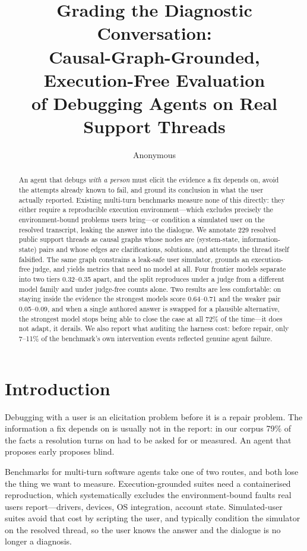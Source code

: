 \documentclass{article}
\title{Grading the Diagnostic Conversation:\\
Causal-Graph-Grounded, Execution-Free Evaluation\\
of Debugging Agents on Real Support Threads}
\author{Anonymous}
\begin{document}
\maketitle

\begin{abstract}
An agent that debugs \emph{with a person} must elicit the evidence a fix
depends on, avoid the attempts already known to fail, and ground its
conclusion in what the user actually reported. Existing multi-turn
benchmarks measure none of this directly: they either require a
reproducible execution environment---which excludes precisely the
environment-bound problems users bring---or condition a simulated user on
the resolved transcript, leaking the answer into the dialogue. We
annotate 229 resolved public support threads as causal graphs whose nodes
are (system-state, information-state) pairs and whose edges are
clarifications, solutions, and attempts the thread itself falsified. The
same graph constrains a leak-safe user simulator, grounds an
execution-free judge, and yields metrics that need no model at all. Four
frontier models separate into two tiers 0.32--0.35 apart, and the split
reproduces under a judge from a different model family and under
judge-free counts alone. Two results are less comfortable: on staying
inside the evidence the strongest models score 0.64--0.71 and the weaker
pair 0.05--0.09, and when a single authored answer is swapped for a
plausible alternative, the strongest model stops being able to close the
case at all 72\% of the time---it does not adapt, it derails. We also
report what auditing the harness cost: before repair, only 7--11\% of the
benchmark's own intervention events reflected genuine agent failure.
\end{abstract}

\section{Introduction}

Debugging with a user is an elicitation problem before it is a repair
problem. The information a fix depends on is usually not in the report:
in our corpus 79\% of the facts a resolution turns on had to be asked
for or measured. An agent that proposes early proposes blind.

Benchmarks for multi-turn software agents take one of two routes, and
both lose the thing we want to measure. Execution-grounded suites need a
containerised reproduction, which systematically excludes the
environment-bound faults real users report---drivers, devices, OS
integration, account state. Simulated-user suites avoid that cost by
scripting the user, and typically condition the simulator on the
resolved thread, so the user knows the answer and the dialogue is no
longer a diagnosis.
\end{document}
